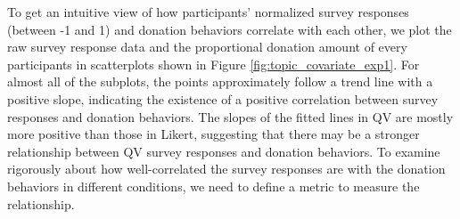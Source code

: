 To get an intuitive view of how participants' normalized survey responses (between -1 and 1) and donation behaviors correlate with each other, we plot the raw survey response data and the proportional donation amount of every participants in scatterplots shown in Figure \ref{fig:topic_covariate_exp1}. For almost all of the subplots, the points approximately follow a trend line with a positive slope, indicating the existence of a positive correlation between survey responses and donation behaviors. The slopes of the fitted lines in QV are mostly more positive than those in Likert, suggesting that there may be a stronger relationship between QV survey responses and donation behaviors. To examine rigorously about how well-correlated the survey responses are with the donation behaviors in different conditions, we need to define a metric to measure the relationship.

